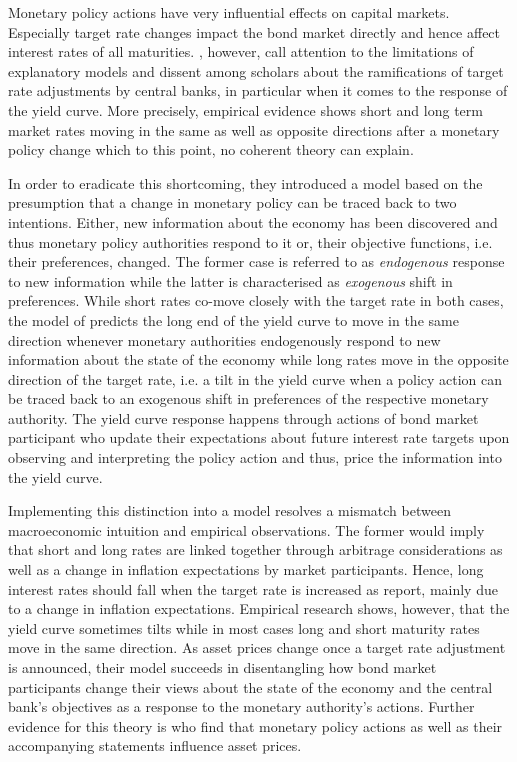 
Monetary policy actions have very influential effects on capital markets. Especially target rate changes impact the bond market directly and hence affect interest rates of all maturities. \textcite{Ellingsen.2001}, however, call attention to the limitations of explanatory models and dissent among scholars about the ramifications of target rate adjustments by central banks, in particular when it comes to the response of the yield curve. More precisely, empirical evidence shows short and long term market rates moving in the same as well as opposite directions after a monetary policy change which to this point, no coherent theory can explain.

In order to eradicate this shortcoming, they introduced a model based on the presumption that a change in monetary policy can be traced back to two intentions. Either, new information about the economy has been discovered and thus monetary policy authorities respond to it or, their objective functions, i.e. their preferences, changed. The former case is referred to as \textit{endogenous} response to new information while the latter is characterised as \textit{exogenous} shift in preferences. While short rates co-move closely with the target rate in both cases, the model of \textcite{Ellingsen.2001} predicts the long end of the yield curve to  move in the same direction whenever monetary authorities endogenously respond to new information about the state of the economy while long rates move in the opposite direction of the target rate, i.e. a tilt in the yield curve when a policy action can be traced back to an exogenous shift in preferences of the respective monetary authority. The yield curve response happens through actions of bond market participant who update their expectations about future interest rate targets upon observing and interpreting the policy action and thus, price the information into the yield curve. 

Implementing this distinction into a model resolves a mismatch between macroeconomic intuition and empirical observations. The former would imply that short and long rates are linked together through arbitrage considerations as well as a change in inflation expectations by market participants. Hence, long interest rates should fall when the target rate is increased as \textcite{Ellingsen.2003} report, mainly due to a change in inflation expectations. Empirical research shows, however, that the yield curve sometimes tilts while in most cases long and short maturity rates move in the same direction. As asset prices change once a target rate adjustment is announced, their model succeeds in disentangling how bond market participants change their views about the state of the economy and the central bank's objectives as a response to the monetary authority's actions. Further evidence for this theory is \textcite{Gurkaynak.2004} who find that monetary policy actions as well as their accompanying statements influence asset prices.

